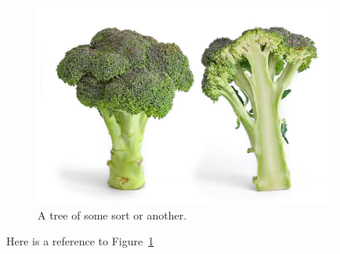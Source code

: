 \documentclass[a4paper]{article}
\begin{document}
\lipsum[2-5]

\begin{figure}
  \centerline{\includegraphics[width=10cm]{broccoli}}
  \caption{A tree of some sort or another.}
\label{figure:broccoli}
\end{figure}

Here is a reference to Figure~\ref{figure:broccoli}

\lipsum[8-10]
\end{document}
